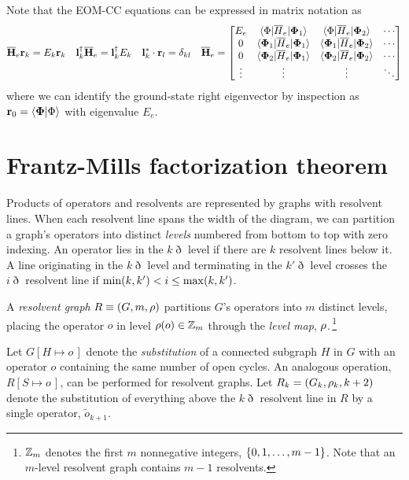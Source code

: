 \documentclass[11pt]{article}
\numberwithin{equation}{section}
\begin{document}
\begin{rmk}
Note that the EOM-CC equations can be expressed in matrix notation as
\begin{align}
\label{eq:eom-matrix-equations}
  \ol{\bo{H}}_e
  \bo{r}_k
=
  E_k
  \bo{r}_k
&&
  \bo{l}_k\dg
  \ol{\bo{H}}_e
=
  \bo{l}_k\dg
  E_k
&&
  \bo{l}_k^*\cdot
  \bo{r}_l
=
  \d_{kl}
&&
  \ol{\bo{H}}_e
=
\pma{
  E_e
&
  \ip{\F|\ol{H}_e|\bo{\F}_1}
&
  \ip{\F|\ol{H}_e|\bo{\F}_2}
&
  \cd
\\
  0
&
  \ip{\bm{\F}_1|\ol{H}_e|\bo{\F}_1}
&
  \ip{\bm{\F}_1|\ol{H}_e|\bo{\F}_2}
&
  \cd
\\
  0
&
  \ip{\bm{\F}_2|\ol{H}_e|\bo{\F}_1}
&
  \ip{\bm{\F}_2|\ol{H}_e|\bo{\F}_2}
&
  \cd
\\
  \vd
&
  \vd
&
  \vd
&
  \dd
}
\end{align}
where we can identify the ground-state right eigenvector by inspection as $\mathbf{r}_0=\langle\mathbf{\Phi }|\Phi \rangle$ with eigenvalue $E_e$.
\end{rmk}




\newpage
\section{Frantz-Mills factorization theorem}

\begin{dfn}
\label{dfn:level}
Products of operators and resolvents are represented by graphs with resolvent lines.
When each resolvent line spans the width of the diagram, we can partition a graph's operators into distinct \textit{levels} numbered from bottom to top with zero indexing.
An operator lies in the $k\eth$ level if there are $k$ resolvent lines below it.
A line originating in the $k\eth$ level and terminating in the $k'{}\eth$ level crosses the $i\eth$ resolvent line if $\mathrm{min}(k,k')<i\leq \mathrm{max}(k,k')$.
\end{dfn}

\begin{dfn}
\label{dfn:resolvent-graph}
A \textit{resolvent graph} $R\equiv(G,m,\rho )$ partitions $G$'s operators into $m$ distinct levels, placing the operator $o$ in level $\rho (o)\in\mathbb{Z}_m$ through the \textit{level map}, $\rho $.\,\footnote{
  $\mathbb{Z}_m$ denotes the first $m$ nonnegative integers,
  $
  \{
    0,1,\ldots,m-1
  \}
  $.
  Note that an $m$-level resolvent graph contains $m-1$ resolvents.
}
\end{dfn}

\begin{dfn}
Let $G[H\mapsto o\,]$ denote the \textit{substitution} of a connected subgraph $H$ in $G$ with an operator $o$ containing the same number of open cycles.
An analogous operation,
$
  R[S\mapsto o\,]
$,
can be performed for resolvent graphs.
Let
$
  R_k
=
(
  G_k,
  \rho _k,
  k+2
)
$
denote the substitution of everything above the $k\eth$ resolvent line in $R$ by a single operator, $\widetilde{o}_{k+1}$.
\end{dfn}
\end{document}
